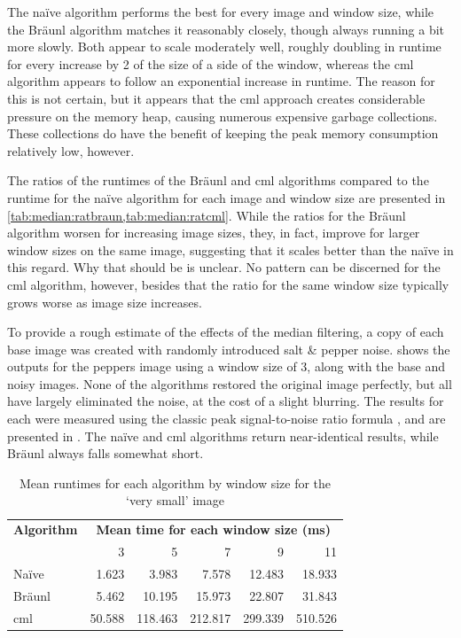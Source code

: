 The naïve algorithm performs the best for every image and window size, while the Bräunl algorithm matches it reasonably closely, though always running a bit more slowly.  Both appear to scale moderately well, roughly doubling in runtime for every increase by 2 of the size of a side of the window, whereas the \gls{cml} algorithm appears to follow an exponential increase in runtime.  The reason for this is not certain, but it appears that the \gls{cml} approach creates considerable pressure on the memory heap, causing numerous expensive garbage collections.  These collections do have the benefit of keeping the peak memory consumption relatively low, however.

The ratios of the runtimes of the Bräunl and \gls{cml} algorithms compared to the runtime for the naïve algorithm for each image and window size are presented in \cref{tab:median:ratbraun,tab:median:ratcml}.  While the ratios for the Bräunl algorithm worsen for increasing image sizes, they, in fact, improve for larger window sizes on the same image, suggesting that it scales better than the naïve in this regard.  Why that should be is unclear.  No pattern can be discerned for the \gls{cml} algorithm, however, besides that the ratio for the same window size typically grows worse as image size increases.

To provide a rough estimate of the effects of the median filtering, a copy of each base image was created with randomly introduced salt \& pepper noise.   shows the outputs for the peppers image using a window size of 3, along with the base and noisy images.  None of the algorithms restored the original image perfectly, but all have largely eliminated the noise, at the cost of a slight blurring.  The results for each were measured using the classic peak signal-to-noise ratio formula \cite{Boncelet2005}, and are presented in .  The naïve and \gls{cml} algorithms return near-identical results, while Bräunl always falls somewhat short.

\begin{table}
\centering
\caption[Mean runtimes for each algorithm for the `very small' image]{Mean runtimes for each algorithm by window size for the `very small' image}
\label{tab:median:verysmall}
\begin{tabular}{@{}lrrrrr@{}}
\toprule
\multicolumn{1}{c}{\textbf{Algorithm}} & \multicolumn{5}{c}{\textbf{Mean time for each window size (ms)}} \\
                              & 3        & 5         & 7         & 9         & 11       \\ \midrule
Naïve                         & 1.623    & 3.983     & 7.578     & 12.483    & 18.933   \\
Bräunl                        & 5.462    & 10.195    & 15.973    & 22.807    & 31.843   \\
\gls{cml}                           & 50.588   & 118.463   & 212.817   & 299.339   & 510.526  \\ \bottomrule
\end{tabular}
\end{table}

